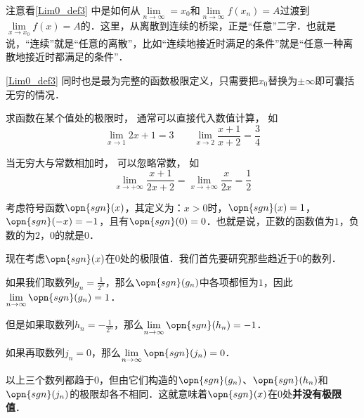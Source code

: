 注意看\autoref{Lim0_def3} 中是如何从$\lim\limits_{n\to\infty}=x_0$和$\lim\limits_{n\to\infty}f(x_n)=A$过渡到$\lim\limits_{x\to x_0}f(x)=A$的．这里，从离散到连续的桥梁，正是“任意”二字．也就是说，“连续”就是“任意的离散”，比如“连续地接近时满足的条件”就是“任意一种离散地接近时都满足的条件”．

\autoref{Lim0_def3} 同时也是最为完整的函数极限定义，只需要把$x_0$替换为$\pm\infty$即可囊括无穷的情况．



\begin{example}{}
求函数在某个值处的极限时， 通常可以直接代入数值计算， 如
\begin{equation}
\lim_{x\to 1} 2x + 1 = 3 \qquad \lim_{x\to 2}\frac{x + 1}{x + 2} = \frac34
\end{equation}

当无穷大与常数相加时， 可以忽略常数， 如
\begin{equation}
\lim_{x\to +\infty} \frac{x + 1}{2x + 2} = \lim_{x\to +\infty} \frac{x}{2x} = \frac12
\end{equation}
\end{example}

\begin{example}{}\label{Lim0_ex2}
考虑符号函数$\opn{sgn}(x)$，其定义为：$x>0$时，$\opn{sgn}(x)=1$，$\opn{sgn}(-x)=-1$，且有$\opn{sgn}(0)=0$．也就是说，正数的函数值为$1$，负数的为$2$，$0$的就是$0$．

现在考虑$\opn{sgn}(x)$在$0$处的极限值．我们首先要研究那些趋近于$0$的数列．

如果我们取数列$g_n=\frac{1}{2^n}$，那么$\opn{sgn}(g_n)$中各项都恒为$1$，因此$\lim\limits_{n\to\infty}\opn{sgn}(g_n)=1$．

但是如果取数列$h_n=-\frac{1}{2^n}$，那么$\lim\limits_{n\to\infty}\opn{sgn}(h_n)=-1$．

如果再取数列$j_n=0$，那么$\lim\limits_{n\to\infty}\opn{sgn}(j_n)=0$．

以上三个数列都趋于$0$，但由它们构造的$\opn{sgn}(g_n)$、$\opn{sgn}(h_n)$和$\opn{sgn}(j_n)$的极限却各不相同．这就意味着$\opn{sgn}(x)$在$0$处\textbf{并没有极限值}．
\end{example}

